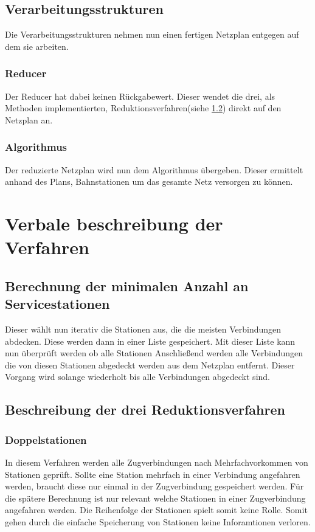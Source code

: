 \subsection{Verarbeitungsstrukturen}\label{ver:subsec:verarbeitungsstrukturen}
Die Verarbeitungsstrukturen nehmen nun einen fertigen Netzplan entgegen auf dem sie arbeiten.\\

\subsubsection{Reducer}\label{ver:subsubsec:reducer}
Der Reducer hat dabei keinen Rückgabewert. Dieser wendet die drei, als Methoden implementierten, Reduktionsverfahren(siehe \ref{ver:subsec:reduktionsverfahren}) direkt auf den Netzplan an.\\

\subsubsection{Algorithmus}\label{ver:subsubsec:algorithmus}
Der reduzierte Netzplan wird nun dem Algorithmus übergeben. Dieser ermittelt anhand des Plans, Bahnstationen um das gesamte Netz versorgen zu können.

\section{Verbale beschreibung der Verfahren}\label{ver:sec:verfahren}
\subsection{Berechnung der minimalen Anzahl an Servicestationen}\label{ver:subsec:berechnung}
Dieser wählt nun iterativ die Stationen aus, die die meisten Verbindungen abdecken. Diese werden dann in einer Liste gespeichert. Mit dieser Liste kann nun überprüft werden ob alle Stationen  Anschließend werden alle Verbindungen die von diesen Stationen abgedeckt werden aus dem Netzplan entfernt. Dieser Vorgang wird solange wiederholt bis alle Verbindungen abgedeckt sind.\\

\subsection{Beschreibung der drei Reduktionsverfahren}\label{ver:subsec:reduktionsverfahren}
\subsubsection{Doppelstationen}\label{ver:subsubsec:doppelstationen}
In diesem Verfahren werden alle Zugverbindungen nach Mehrfachvorkommen von Stationen geprüft. Sollte eine Station mehrfach in einer Verbindung angefahren werden, braucht diese nur einmal in der Zugverbindung gespeichert werden. Für die spätere Berechnung ist nur relevant welche Stationen in einer Zugverbindung angefahren werden. Die Reihenfolge der Stationen spielt somit keine Rolle. Somit gehen durch die einfache Speicherung von Stationen keine Inforamtionen verloren.\\

